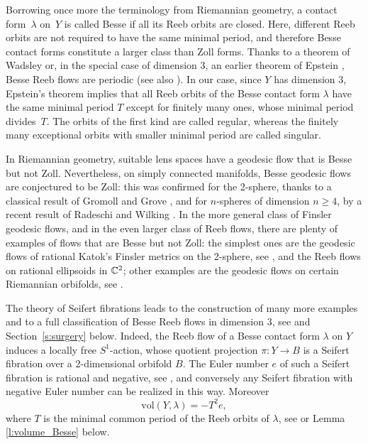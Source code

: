 \documentclass[JEP,XML,SOM,Unicode,published]{cedram}
\theoremstyle{definition}
\newcommand{\vol}{\mathrm{vol}}
\let\eul e
\begin{document}
Borrowing once more the terminology from Riemannian geometry, a contact form~$\lambda$ on~$Y$ is called Besse if all its Reeb orbits are closed. Here, different Reeb orbits are not required to have the same minimal period, and therefore Besse contact forms constitute a larger class than Zoll forms. Thanks to a theorem of Wadsley \cite{Wadsley:1975sp} or, in the special case of dimension $3$, an earlier theorem of Epstein \cite{Epstein:1972}, Besse Reeb flows are periodic (see also \cite{Sullivan:1978}). In our case, since $Y$ has dimension $3$, Epstein's theorem implies that all Reeb orbits of the Besse contact form $\lambda$ have the same minimal period $T$ except for finitely many ones, whose minimal period divides~$T$. The orbits of the first kind are called regular, whereas the finitely many exceptional orbits with smaller minimal period are called singular.

In Riemannian geometry, suitable lens spaces have a geodesic flow that is Besse but not Zoll. Nevertheless, on simply connected manifolds, Besse geodesic flows are conjectured to be Zoll: this was confirmed for the 2-sphere, thanks to a classical result of Gromoll and Grove \cite{Gromoll:1981kl}, and for $n$-spheres of dimension $n\geq 4$, by a recent result of Radeschi and Wilking \cite{Radeschi:2017dz}. In the more general class of Finsler geodesic flows, and in the even larger class of Reeb flows, there are plenty of examples of flows that are Besse but not Zoll: the simplest ones are the geodesic flows of rational Katok's Finsler metrics on the 2-sphere, see \cite{Katok:1973mw,Ziller:1983rw}, and the Reeb flows on rational ellipsoids in $\mathbb{C}^2$; other examples are the geodesic flows on certain Riemannian orbifolds, see \cite{Besse:1978pr,Lange:2020,Lange:2021}.

The theory of Seifert fibrations leads to the construction of many more examples and to a full classification of Besse Reeb flows in dimension $3$, see \cite{Kegel:2021vo} and Section~\ref{s:surgery} below. Indeed, the Reeb flow of a Besse contact form $\lambda$ on $Y$ induces a locally free $S^1$-action, whose quotient projection $\pi: Y \to B$ is a Seifert fibration over a 2-dimensional orbifold $B$. The Euler number $\eul$ of such a Seifert fibration is rational and negative, see \cite{Lisca:2004oz}, and conversely any Seifert fibration with negative Euler number can be realized in this way. Moreover
\begin{equation}
\label{volumeBesse}
\vol(Y,\lambda) = -T^2 \eul,
\end{equation}
where $T$ is the minimal common period of the Reeb orbits of $\lambda$, see \cite[Cor.\,6.3]{Geiges:2020aa} or Lemma \ref{l:volume_Besse} below.
\end{document}
